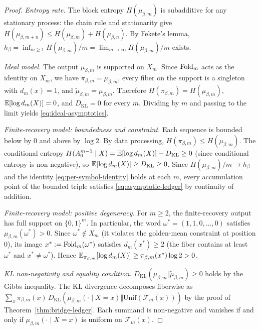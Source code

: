 \begin{proof}
\emph{Entropy rate.}\enspace
The block entropy $H(\mu_{\beta,m})$ is subadditive for any stationary process: the chain rule and stationarity give $H(\mu_{\beta,m+n})\le H(\mu_{\beta,m})+H(\mu_{\beta,n})$. By Fekete's lemma, $h_\beta=\inf_{m\ge 1}H(\mu_{\beta,m})/m=\lim_{m\to\infty}H(\mu_{\beta,m})/m$ exists.

\emph{Ideal model.}\enspace
The output $\mu_{\beta,m}$ is supported on $X_m$. Since $\mathrm{Fold}_m$ acts as the identity on $X_m$, we have $\pi_{\beta,m}=\mu_{\beta,m}$, every fiber on the support is a singleton with $d_m(x)=1$, and $\widetilde\mu_{\beta,m}=\mu_{\beta,m}$. Therefore $H(\pi_{\beta,m})=H(\mu_{\beta,m})$, $\mathbb{E}[\log d_m(X)]=0$, and $D_{\mathrm{KL}}=0$ for every $m$. Dividing by $m$ and passing to the limit yields \eqref{eq:ideal-asymptotics}.

\emph{Finite-recovery model: boundedness and constraint.}\enspace
Each sequence is bounded below by $0$ and above by $\log 2$. By data processing, $H(\pi_{\beta,m})\le H(\mu_{\beta,m})$. The conditional entropy $H(A_0^{m-1}\mid X)=\mathbb{E}[\log d_m(X)]-D_{\mathrm{KL}}\ge 0$ (since conditional entropy is non-negative), so $\mathbb{E}[\log d_m(X)]\ge D_{\mathrm{KL}}\ge 0$. Since $H(\mu_{\beta,m})/m\to h_\beta$ and the identity \eqref{eq:per-symbol-identity} holds at each $m$, every accumulation point of the bounded triple satisfies \eqref{eq:asymptotic-ledger} by continuity of addition.

\emph{Finite-recovery model: positive degeneracy.}\enspace
For $m\ge 2$, the finite-recovery output has full support on $\{0,1\}^m$. In particular, the word $\omega^*=(1,1,0,\dots,0)$ satisfies $\mu_{\beta,m}(\omega^*)>0$. Since $\omega^*\notin X_m$ (it violates the golden-mean constraint at position $0$), its image $x^*:=\mathrm{Fold}_m(\omega^*)$ satisfies $d_m(x^*)\ge 2$ (the fiber contains at least $\omega^*$ and $x^*\neq\omega^*$). Hence $\mathbb{E}_{\pi_{\beta,m}}[\log d_m(X)]\ge\pi_{\beta,m}(x^*)\log 2>0$.

\emph{KL non-negativity and equality condition.}\enspace
$D_{\mathrm{KL}}(\mu_{\beta,m}\Vert\widetilde\mu_{\beta,m})\ge 0$ holds by the Gibbs inequality. The KL divergence decomposes fiberwise as $\sum_{x}\pi_{\beta,m}(x)\,D_{\mathrm{KL}}(\mu_{\beta,m}(\cdot\mid X\!=\!x)\Vert\mathrm{Unif}(\mathcal F_m(x)))$ by the proof of Theorem~\ref{thm:bridge-ledger}. Each summand is non-negative and vanishes if and only if $\mu_{\beta,m}(\cdot\mid X\!=\!x)$ is uniform on $\mathcal F_m(x)$.
\end{proof}
